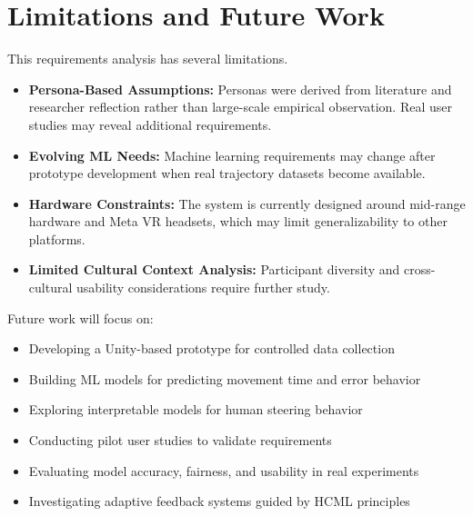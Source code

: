 \documentclass[sigconf]{acmart}
\begin{document}
\section{Limitations and Future Work}

This requirements analysis has several limitations.

\begin{itemize}

\item \textbf{Persona-Based Assumptions:}  
Personas were derived from literature and researcher reflection rather than large-scale empirical observation. Real user studies may reveal additional requirements.

\item \textbf{Evolving ML Needs:}  
Machine learning requirements may change after prototype development when real trajectory datasets become available.

\item \textbf{Hardware Constraints:}  
The system is currently designed around mid-range hardware and Meta VR headsets, which may limit generalizability to other platforms.

\item \textbf{Limited Cultural Context Analysis:}  
Participant diversity and cross-cultural usability considerations require further study.

\end{itemize}

Future work will focus on:

\begin{itemize}
\item Developing a Unity-based prototype for controlled data collection
\item Building ML models for predicting movement time and error behavior
\item Exploring interpretable models for human steering behavior
\item Conducting pilot user studies to validate requirements
\item Evaluating model accuracy, fairness, and usability in real experiments
\item Investigating adaptive feedback systems guided by HCML principles
\end{itemize}



\end{document}
